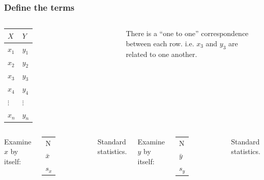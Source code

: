 \begin{frame}
  \frametitle{Define the terms}

  \begin{columns}

    \begin{tabular}{l|l}
      $X$ & $Y$ \\ \hline
      $x_1$ & $y_1$ \\
      $x_2$ & $y_2$ \\
      $x_3$ & $y_3$ \\
      $x_4$ & $y_4$ \\
      $\vdots$ & $\vdots$ \\
      $x_n$ & $y_n$ \\
    \end{tabular}


    \vfill


    {
      There is a ``one to one'' correspondence between each
      row. i.e. $x_3$ and $y_3$ are related to one another.

    }

    \vfill

  \end{columns}


  \begin{columns}

     {

      Examine $x$ by itself: \\
      \begin{tabular}{l}
        N \\
        $\bar{x}$ \\
        $s_x$
      \end{tabular}

      Standard statistics.

    }
      


     {

      Examine $y$ by itself: \\
      \begin{tabular}{l}
        N \\
        $\bar{y}$ \\
        $s_y$
      \end{tabular}

      Standard statistics.


    }


  \end{columns}


\end{frame}



